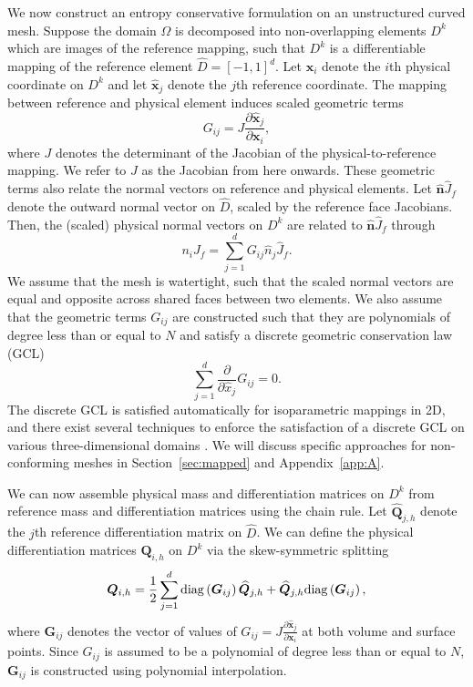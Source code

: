 \documentclass{svjour3}                     %
\renewcommand{\hat}{\widehat}
\newcommand{\diag}[1]{{\rm diag}\LRp{#1}}
\newcommand{\pd}[2]{\frac{\partial#1}{\partial#2}}
\newcommand{\LRp}[1]{\left( #1 \right)}
\begin{document}
We now construct an entropy conservative formulation on an unstructured curved mesh.  
Suppose the domain $\Omega$ is decomposed into non-overlapping elements $D^k$ which are images of the reference mapping, such that $D^k$ is a differentiable mapping of the reference element $\hat{D} = [-1,1]^d$.  Let $\bm{x}_i$ denote the $i$th physical coordinate on $D^k$ and let $\hat{\bm{x}}_j$ denote the $j$th reference coordinate.  The mapping between reference and physical element induces scaled geometric terms 
\[
G_{ij} = J\pd{\hat{\bm{x}}_j}{\bm{x}_i},
\]
where $J$ denotes the determinant of the Jacobian of the physical-to-reference mapping.  We refer to $J$ as the Jacobian from here onwards.
These geometric terms also relate the normal vectors on reference and physical elements.  Let $\hat{\bm{n}}\hat{J}_f$ denote the outward normal vector on $\hat{D}$, scaled by the reference face Jacobians.  Then, the (scaled) physical normal vectors on $D^k$ are related to $\hat{\bm{n}}\hat{J}_f$ through
\begin{equation}
{n}_iJ_f = \sum_{j=1}^d{G}_{ij}\hat{{n}}_j\hat{J}_f.
\label{eq:nJ_Gnhat}
\end{equation}
We assume that the mesh is watertight, such that the scaled normal vectors are equal and opposite across shared faces between two elements.  We also assume that the geometric terms ${G}_{ij}$ are constructed such that they are polynomials of degree less than or equal to $N$ and satisfy a discrete geometric conservation law (GCL)
\begin{equation}
\sum_{j=1}^d \pd{}{\hat{x}_j} G_{ij} = 0.
\label{eq:dgcl}
\end{equation}
The discrete GCL is satisfied automatically for isoparametric mappings in 2D, and there exist several techniques to enforce the satisfaction of a discrete GCL on various three-dimensional domains \cite{thomas1979geometric, kopriva2006metric, crean2018entropy, chan2018discretely, kozdon2018energy, kopriva2019free}.  We will discuss specific approaches for non-conforming meshes in Section~\ref{sec:mapped} and Appendix~\ref{app:A}.

We can now assemble physical mass and differentiation matrices on $D^k$ from reference mass and differentiation matrices using the chain rule.  Let $\hat{\bm{Q}}_{j,h}$ denote the $j$th reference differentiation matrix on $\hat{D}$.  We can define the physical differentiation matrices $\bm{Q}_{i,h}$ on $D^k$ via the skew-symmetric splitting
\begin{equation}
\bm{Q}_{i,h} = \frac{1}{2}\sum_{j=1}^d \diag{\bm{G}_{ij}}\hat{\bm{Q}}_{j,h} + \hat{\bm{Q}}_{j,h} \diag{\bm{G}_{ij}},
\label{eq:curvedQ}
\end{equation}
where $\bm{G}_{ij}$ denotes the vector of values of $G_{ij} = J\pd{\hat{\bm{x}}_j}{\bm{x}_i}$ at both volume and surface points.  Since $G_{ij}$ is assumed to be a polynomial of degree less than or equal to $N$, $\bm{G}_{ij}$ is constructed using polynomial interpolation.
\end{document}
